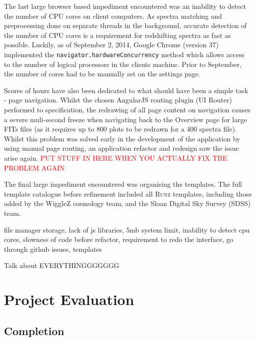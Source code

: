 \documentclass[titlesmallcaps, examinerscopy, copyrightpage]{uqthesis}
\newcommand{\runz}{\textsc{Runz}}
\begin{document}
The last large browser based impediment encountered was an inability to detect the number of CPU cores on client computers. As spectra matching and preprocessing done on separate threads in the background, accurate detection of the number of CPU cores is a requirement for redshifting spectra as fast as possible. Luckily, as of September 2, 2014, Google Chrome (version 37) implemented the \verb+navigator.hardwareConcurrency+ method \cite{chrome1,chrome2} which allows access to the number of logical processors in the clients machine. Prior to September, the number of cores had to be manually set on the settings page.

Scores of hours have also been dedicated to what should have been a simple task - page navigation. Whilst the chosen AngularJS routing plugin (UI Router) performed to specification, the redrawing of all page content on navigation causes a severe muli-second freeze when navigating back to the Overview page for large FITs files (as it requires up to 800 plots to be redrawn for a 400 spectra file). Whilst this problem was solved early in the development of the application by using manual page routing, an application refactor and redesign saw the issue arise again. \textcolor{red}{PUT STUFF IN HERE WHEN YOU ACTUALLY FIX THE PROBLEM AGAIN}

The final large impediment encountered was organising the templates. The full template catalogue before refinement included all \runz{} templates, including those added by the WiggleZ cosmology team, and the Sloan Digital Sky Survey (SDSS) team. 

file manager storage, lack of js libraries, 5mb system limit, inability to detect cpu cores, slowness of code before refactor, requirement to redo the interface, go through github issues, templates

Talk about EVERYTHINGGGGGGG





\chapter{Project Evaluation}




\section{Completion}
\end{document}
